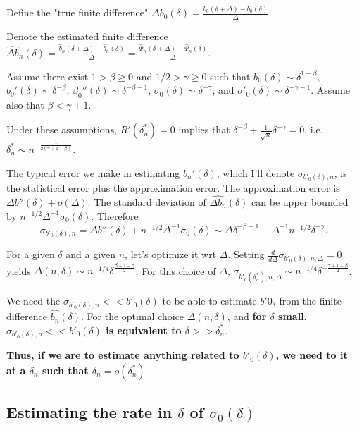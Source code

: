 \documentclass[a4paper]{article}
\begin{document}
Define the "true finite difference" $\Delta b_0(\delta) = \frac{b_0(\delta + \Delta) - b_0(\delta)}{\Delta}$

Denote the estimated finite difference $\widehat{\Delta b}_n(\delta) = \frac{\hat{b}_n(\delta + \Delta) - \hat{b}_n(\delta)}{\Delta} = \frac{\hat{\Psi}_n(\delta + \Delta) - \hat{\Psi}_n(\delta)}{\Delta}$.

\medskip

Assume there exist $1 > \beta \geq 0$ and $1/2 > \gamma \geq 0$ such that $b_0(\delta) \sim \delta^{1 - \beta}$, $b_0'(\delta) \sim \delta^{-\beta}$, $\beta_0''(\delta) \sim \delta^{-\beta - 1}$, $\sigma_0(\delta) \sim \delta^{-\gamma}$, and $\sigma'_0(\delta) \sim \delta^{-\gamma - 1}$. Assume also that $\beta < \gamma + 1$.

Under these assumptions, $R'(\delta_n^*) = 0$ implies that $\delta^{-\beta}  + \frac{1}{\sqrt{n}} \delta^{-\gamma} = 0$, i.e. $\delta_n^* \sim n^{-\frac{1}{2(\gamma + 1 - \beta)}}$.

\smallskip

The typical error we make in estimating $b_n'(\delta)$, which I'll denote $\sigma_{b'_0(\delta), n}$, is the statistical error plus the approximation error. The approximation error is $\Delta b''(\delta) + o(\Delta)$. The standard deviation of $\widehat{\Delta b_n}(\delta)$ can be upper bounded by $n^{-1/2} \Delta^{-1} \sigma_0(\delta)$. Therefore
$$\sigma_{b'_0(\delta), n} = \Delta b''(\delta) + n^{-1/2} \Delta^{-1} \sigma_0(\delta) \sim \Delta \delta^{-\beta - 1} + \Delta^{-1} n^{-1/2} \delta^{-\gamma}.$$


For a given $\delta$ and a given $n$, let's optimize it wrt $\Delta$. Setting $ \frac{d}{d \Delta} \sigma_{b'_0(\delta), n, \Delta} = 0$ yields $\Delta(n, \delta) \sim n^{-1/4} \delta^\frac{\beta + 1 - \gamma}{2}$. For this choice of $\Delta$, $\sigma_{b'_0   (\delta^*_n), n, \Delta} \sim n^{-1/4} \delta^{-\frac{\gamma + 1 + \beta}{2}}$.


We need the $\sigma_{b'_0(\delta), n} << b'_0(\delta)$ to be able to estimate $b'0_{\delta}$ from the finite difference $\widehat{b_n}(\delta)$. For the optimal choice $\Delta(n, \delta)$, and \textbf{for $\delta$ small, $\sigma_{b'_0(\delta), n} << b'_0(\delta)$ is equivalent to $\delta >> \delta_n^*$}.

\textbf{Thus, if we are to estimate anything related to $b'_0(\delta)$, we need to it at a $\tilde{\delta}_n$ such that $\tilde{{\delta}_n} = o(\delta_n^*)$}

\subsection{Estimating the rate in $\delta$ of $\sigma_0(\delta)$}
\end{document}

